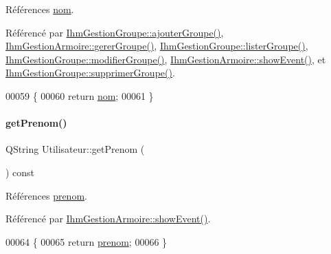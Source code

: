 Références \hyperlink{class_utilisateur_a1096e809aca4b7cf453a7af93cb72502}{nom}.



Référencé par \hyperlink{class_ihm_gestion_groupe_a5e5b11cb395970f64b30427ccb2ecf4d}{Ihm\+Gestion\+Groupe\+::ajouter\+Groupe()}, \hyperlink{class_ihm_gestion_armoire_a4cd664c766e29593d3fedf2baea6a330}{Ihm\+Gestion\+Armoire\+::gerer\+Groupe()}, \hyperlink{class_ihm_gestion_groupe_a7afabe81c405b35e7cfd4e760eda8c84}{Ihm\+Gestion\+Groupe\+::lister\+Groupe()}, \hyperlink{class_ihm_gestion_groupe_a810c186bf38dab776c7167c85671b268}{Ihm\+Gestion\+Groupe\+::modifier\+Groupe()}, \hyperlink{class_ihm_gestion_armoire_ad0f3d63f9b93fc902de40a9a546f709c}{Ihm\+Gestion\+Armoire\+::show\+Event()}, et \hyperlink{class_ihm_gestion_groupe_a08bdd132a37ac574b15d00e4dc959d7f}{Ihm\+Gestion\+Groupe\+::supprimer\+Groupe()}.


\begin{DoxyCode}
00059 \{
00060     \textcolor{keywordflow}{return} \hyperlink{class_utilisateur_a1096e809aca4b7cf453a7af93cb72502}{nom};
00061 \}
\end{DoxyCode}
\mbox{\label{class_utilisateur_ac4483808ad54888c66a4235133d135d5}} 
\paragraph{\texorpdfstring{get\+Prenom()}{getPrenom()}}
{\footnotesize\ttfamily Q\+String Utilisateur\+::get\+Prenom (\begin{DoxyParamCaption}{ }\end{DoxyParamCaption}) const}



Références \hyperlink{class_utilisateur_a1dd0779807b19298f30f39d9c371170f}{prenom}.



Référencé par \hyperlink{class_ihm_gestion_armoire_ad0f3d63f9b93fc902de40a9a546f709c}{Ihm\+Gestion\+Armoire\+::show\+Event()}.


\begin{DoxyCode}
00064 \{
00065     \textcolor{keywordflow}{return} \hyperlink{class_utilisateur_a1dd0779807b19298f30f39d9c371170f}{prenom};
00066 \}
\end{DoxyCode}
\mbox{\label{class_utilisateur_a8d838ae68c0be760d6fb4a27d8d7ba08}} 
